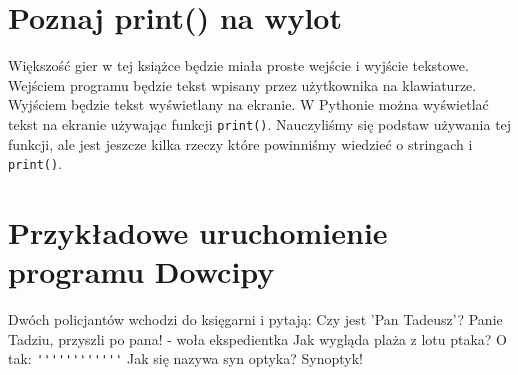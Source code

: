 \documentclass{book}
\begin{document}
\section{Poznaj print() na wylot}

Większość gier w tej książce będzie miała proste wejście i wyjście tekstowe. Wejściem programu będzie tekst wpisany przez użytkownika na klawiaturze. Wyjściem będzie tekst wyświetlany na ekranie. W Pythonie można wyświetlać tekst na ekranie używając funkcji \lstinline{print()}. Nauczyliśmy się podstaw używania tej funkcji, ale jest jeszcze kilka rzeczy które powinniśmy wiedzieć o stringach i \lstinline{print()}.

\section{Przykładowe uruchomienie programu Dowcipy}

\begin{pseudolisting}
Dwóch policjantów wchodzi do księgarni i pytają:\linebreak
Czy jest 'Pan Tadeusz'?\linebreak
\linebreak
Panie Tadziu, przyszli po pana! - woła ekspedientka\linebreak
\linebreak
Jak wygląda plaża z lotu ptaka?\linebreak
\linebreak
O tak: \lstinline{''''''''''''}\linebreak
\linebreak
Jak się nazywa syn optyka?\linebreak
\linebreak
Synoptyk!\linebreak
\end{pseudolisting}
\end{document}
